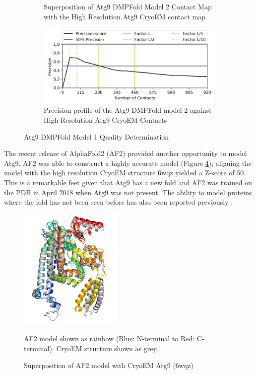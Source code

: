 \begin{figure}[htb]
\begin{subfigure}{0.25\textwidth}
  \caption{Superposition of Atg9 DMPFold Model 2 Contact Map with the High Resolution Atg9 CryoEM contact map}
  \label{fig:1}
\end{subfigure}\hfil %
\begin{subfigure}{0.25\textwidth}
  \includegraphics[width=\linewidth]{Modelling of Atg9/dmp_m2_prec.png}
  \caption{Precision profile of the Atg9 DMPFold model 2 against High Resolution Atg9 CryoEM Contacts}
  \label{fig:1}
\end{subfigure}\hfil %
\caption{Atg9 DMPFold Model 1 Quality Determination}
\small
\label{fig:atg9_dmp_m2_quality}
\end{figure}

The recent release of AlphaFold2 (AF2) \cite{Jumper2021} provided another opportunity to model Atg9. AF2 was able to construct a highly accurate model (Figure \ref{fig:af_6wqz}); aligning the model with the high resolution CryoEM structure 6wqz yielded a Z-score
of 50. This is a remarkable feet given that Atg9 has a new fold and AF2 was trained on the PDB in April 2018 when Atg9 was not present. The ability to model proteins where the fold has not been seen before has also been reported previously \cite{hegedHus2021alphafold2}.

\begin{figure}[th!]
    \centering
    \includegraphics[width=50mm, scale=0.5]{Modelling of Atg9/af_6wqz.png}
    \caption{Superposition of AF2 model with CryoEM Atg9 (6wqz)}
    \label{fig:af_6wqz}
    \small
    AF2 model shown as rainbow (Blue: N-terminal to Red: C-terminal). CryoEM structure shown as grey.
\end{figure}

